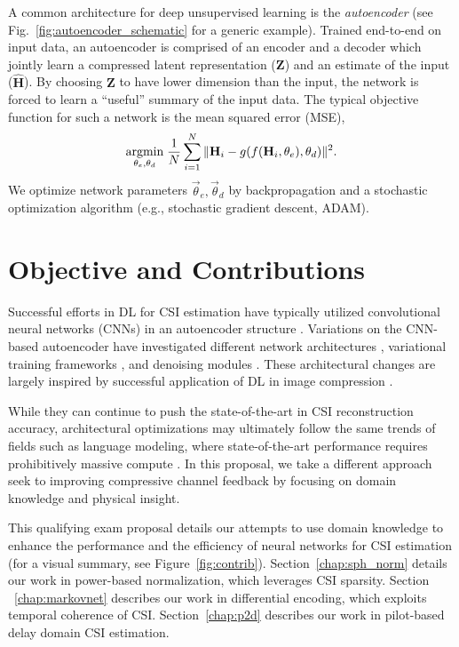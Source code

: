 A common architecture for deep unsupervised learning is the \emph{autoencoder} (see Fig.~\ref{fig:autoencoder_schematic} for a generic example). Trained end-to-end on input data, an autoencoder is comprised of an encoder and a decoder which jointly learn a compressed latent representation ($\mathbf Z$) and an estimate of the input ($\hat{\mathbf H}$). By choosing $\mathbf Z$ to have lower dimension than the input, the network is forced to learn a ``useful'' summary of the input data. The typical objective function for such a network is the mean squared error (MSE),
\begin{align*}
\underset{\theta_e, \theta_d}{\text{argmin}}\; \frac 1N \sum_{i=1}^N\Arrowvert \mathbf H_i - g(f(\mathbf H_i, \theta_e), \theta_d) \Arrowvert^2.
\end{align*}
We optimize network parameters $\vec \theta_e, \vec \theta_d$ by backpropagation and a stochastic optimization algorithm (e.g., stochastic gradient descent, ADAM).

\section{Objective and Contributions}

Successful efforts in DL for CSI estimation have typically utilized convolutional neural networks (CNNs) in an autoencoder structure \cite{ref:csinet}. Variations on the CNN-based autoencoder have investigated different network architectures \cite{ref:Lu2020CRNet}, variational training frameworks \cite{ref:Hussien2020PRVNet}, and denoising modules \cite{ref:Sun2020AnciNet}. These architectural changes are largely inspired by successful application of DL in image compression \cite{ref:szegedy2017inception,ref:balle2017end,ref:xie2012image}.

While they can continue to push the state-of-the-art in CSI reconstruction accuracy, architectural optimizations may ultimately follow the same trends of fields such as language modeling, where state-of-the-art performance requires prohibitively massive compute \cite{ref:brown2020language}. In this proposal, we take a different approach seek to improving compressive channel feedback by focusing on domain knowledge and physical insight.

This qualifying exam proposal details our attempts to use domain knowledge to enhance the performance and the efficiency of neural networks for CSI estimation (for a visual summary, see Figure~\ref{fig:contrib}). Section~\ref{chap:sph_norm} details our work in power-based normalization, which leverages CSI sparsity. Section ~\ref{chap:markovnet} describes our work in differential encoding, which exploits temporal coherence of CSI. Section~\ref{chap:p2d} describes our work in pilot-based delay domain CSI estimation.

